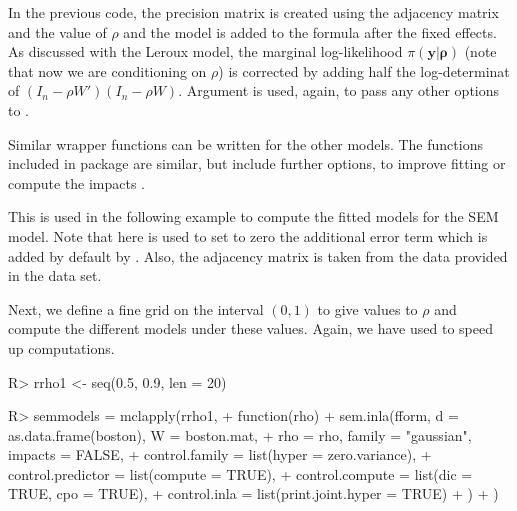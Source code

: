 \documentclass[article]{jss}
\begin{document}
In the previous code, the precision matrix  is created using the
adjacency matrix and the value of $\rho$ and the  model is added
to the formula after the fixed effects. As discussed with the Leroux model, the
marginal log-likelihood $\pi(\mathbf{y|\rho})$  (note that now we are
conditioning on $\rho$) is corrected by adding half the log-determinat of
$(I_n-\rho W')(I_n-\rho W)$.  Argument  is used, again, to pass any other
options to .

Similar wrapper functions can be written for the other models. The functions
included in package  are similar, but include further options,
to improve fitting or compute the impacts 
\citep[see,][for details]{Bivandetal:2014}.

This is used in the following example to compute the fitted models
for the SEM model. Note that here  is used to set
to zero the additional error term which is added by default by .
Also, the adjacency matrix is taken from the data provided in the 
data set.

\begin{Schunk}
\end{Schunk}

Next, we define a fine grid on the interval $(0,1)$ to give values
to $\rho$ and compute the different models under these values. Again,
we have used   to speed up computations.


\begin{Schunk}
\begin{Sinput}
R> rrho1 <- seq(0.5, 0.9, len = 20)
\end{Sinput}
\end{Schunk}
\begin{Schunk}
\begin{Sinput}
R> semmodels = mclapply(rrho1,
+          function(rho) {
+                  sem.inla(fform, d = as.data.frame(boston), W = boston.mat, 
+  			rho = rho, family = "gaussian", impacts = FALSE,
+                          control.family = list(hyper = zero.variance),
+                          control.predictor = list(compute = TRUE),
+                          control.compute = list(dic = TRUE, cpo = TRUE),
+                          control.inla = list(print.joint.hyper = TRUE)
+                  )
+          })
\end{Sinput}
\end{Schunk}
\end{document}
